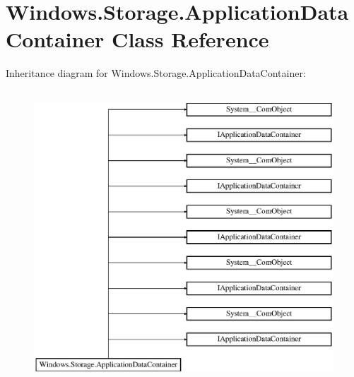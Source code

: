 \hypertarget{class_windows_1_1_storage_1_1_application_data_container}{}\section{Windows.\+Storage.\+Application\+Data\+Container Class Reference}
\label{class_windows_1_1_storage_1_1_application_data_container}
Inheritance diagram for Windows.\+Storage.\+Application\+Data\+Container\+:\begin{figure}[H]
\begin{center}
\leavevmode
\includegraphics[height=11.000000cm]{class_windows_1_1_storage_1_1_application_data_container}
\end{center}
\end{figure}
